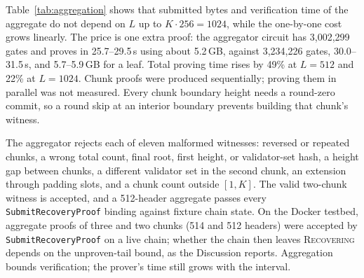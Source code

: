 Table~\ref{tab:aggregation} shows that submitted bytes and verification time of
the aggregate do not depend on $L$ up to $K \cdot 256 = 1024$, while the
one-by-one cost grows linearly. The price is one extra proof: the aggregator
circuit has 3{,}002{,}299 gates and proves in 25.7--29.5\,s using about 5.2\,GB,
against 3{,}234{,}226 gates, 30.0--31.5\,s, and 5.7--5.9\,GB for a leaf. Total
proving time rises by 49\% at $L{=}512$ and 22\% at $L{=}1024$. Chunk proofs
were produced sequentially; proving them in parallel was not measured. Every
chunk boundary height needs a round-zero commit, so a round skip at an interior
boundary prevents building that chunk's witness.

The aggregator rejects each of eleven malformed witnesses: reversed or repeated
chunks, a wrong total count, final root, first height, or validator-set hash,
a height gap between chunks, a different validator set in the second chunk,
an extension through padding slots, and a chunk count outside $[1,K]$. The
valid two-chunk witness is accepted, and a 512-header aggregate passes every
\texttt{SubmitRecoveryProof} binding against fixture chain state. On the Docker
testbed, aggregate proofs of three and two chunks (514 and 512 headers) were
accepted by \texttt{SubmitRecoveryProof} on a live chain; whether the chain then
leaves \textsc{Recovering} depends on the unproven-tail bound, as the
Discussion reports. Aggregation bounds verification; the prover's time still
grows with the interval.

\FloatBarrier
